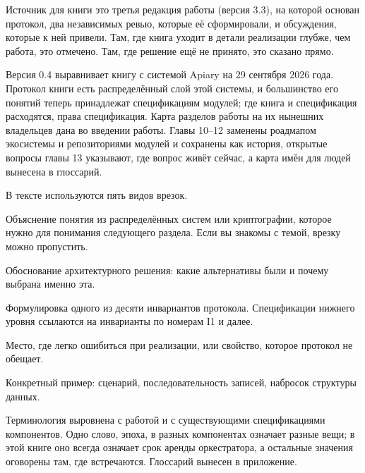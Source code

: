 Источник для книги это третья редакция работы (версия 3.3), на которой основан протокол, два независимых ревью, которые её сформировали, и обсуждения, которые к ней привели. Там, где книга уходит в детали реализации глубже, чем работа, это отмечено. Там, где решение ещё не принято, это сказано прямо.

Версия 0.4 выравнивает книгу с системой Apiary на 29 сентября 2026 года. Протокол книги есть распределённый слой этой системы, и большинство его понятий теперь принадлежат спецификациям модулей; где книга и спецификация расходятся, права спецификация. Карта разделов работы на их нынешних владельцев дана во введении работы. Главы 10--12 заменены роадмапом экосистемы и репозиториями модулей и сохранены как история, открытые вопросы главы 13 указывают, где вопрос живёт сейчас, а карта имён для людей вынесена в глоссарий.

В тексте используются пять видов врезок.

\begin{likbez}
Объяснение понятия из распределённых систем или криптографии, которое нужно для понимания следующего раздела. Если вы знакомы с темой, врезку можно пропустить.
\end{likbez}

\begin{whybox}
Обоснование архитектурного решения: какие альтернативы были и почему выбрана именно эта.
\end{whybox}

\begin{invbox}
Формулировка одного из десяти инвариантов протокола. Спецификации нижнего уровня ссылаются на инварианты по номерам I1 и далее.
\end{invbox}

\begin{warnbox}
Место, где легко ошибиться при реализации, или свойство, которое протокол не обещает.
\end{warnbox}

\begin{exbox}
Конкретный пример: сценарий, последовательность записей, набросок структуры данных.
\end{exbox}

Терминология выровнена с работой и с существующими спецификациями компонентов. Одно слово, эпоха, в разных компонентах означает разные вещи; в этой книге оно всегда означает срок аренды оркестратора, а остальные значения оговорены там, где встречаются. Глоссарий вынесен в приложение.
